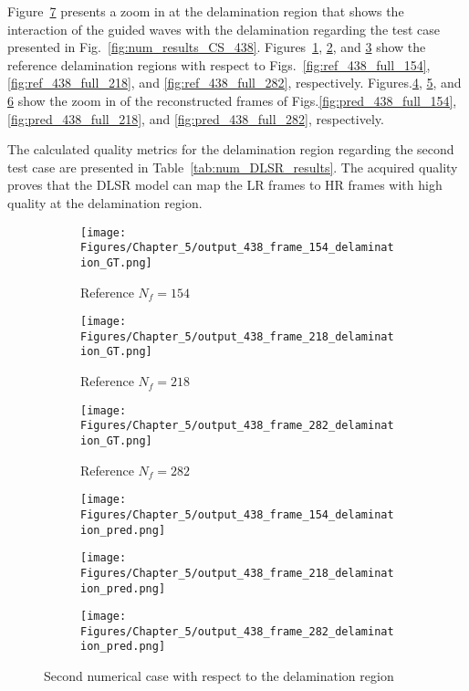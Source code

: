 Figure~\ref{fig:num_results_CS_damage_area_438} presents a zoom in at the delamination region that shows the interaction of the guided waves with the delamination regarding the test case presented in Fig.~\ref{fig:num_results_CS_438}.
Figures~\ref{fig:ref_438_damage_154}, \ref{fig:ref_438_damage_218}, and \ref{fig:ref_438_damage_282} show the reference delamination regions with respect to Figs.~\ref{fig:ref_438_full_154}, \ref{fig:ref_438_full_218}, and \ref{fig:ref_438_full_282}, respectively.
Figures.\ref{fig:pred_438_damage_154}, \ref{fig:pred_438_damage_218}, and \ref{fig:pred_438_damage_282} show the zoom in of the reconstructed frames of Figs.\ref{fig:pred_438_full_154}, \ref{fig:pred_438_full_218}, and \ref{fig:pred_438_full_282}, respectively.

The calculated quality metrics for the delamination region regarding the second test case are presented in Table~\ref{tab:num_DLSR_results}.
The acquired quality proves that the DLSR model can map the LR frames to HR frames with high quality at the delamination region.
\begin{figure} [!ht]
	\centering
	\begin{subfigure}[b]{.32\textwidth}
		\centering
		\texttt{[image: Figures/Chapter\_5/output\_438\_frame\_154\_delamination\_GT.png]}
		\caption{Reference $N_f=154$}
		\label{fig:ref_438_damage_154}
	\end{subfigure}
	\begin{subfigure}[b]{.32\textwidth}
		\centering
		\texttt{[image: Figures/Chapter\_5/output\_438\_frame\_218\_delamination\_GT.png]}
		\caption{Reference $N_f=218$}
		\label{fig:ref_438_damage_218}
	\end{subfigure}
	\begin{subfigure}[b]{.32\textwidth}
		\centering
		\texttt{[image: Figures/Chapter\_5/output\_438\_frame\_282\_delamination\_GT.png]}
		\caption{Reference $N_f=282$}
		\label{fig:ref_438_damage_282}	
	\end{subfigure}
	\begin{subfigure}[b]{.32\textwidth}
		\centering
		\texttt{[image: Figures/Chapter\_5/output\_438\_frame\_154\_delamination\_pred.png]}
		\caption{}
		\label{fig:pred_438_damage_154}
	\end{subfigure}
	\begin{subfigure}[b]{.32\textwidth}
		\centering
		\texttt{[image: Figures/Chapter\_5/output\_438\_frame\_218\_delamination\_pred.png]}
		\caption{}
		\label{fig:pred_438_damage_218}
	\end{subfigure}
	\begin{subfigure}[b]{.32\textwidth}
		\centering
		\texttt{[image: Figures/Chapter\_5/output\_438\_frame\_282\_delamination\_pred.png]}
		\caption{}
		\label{fig:pred_438_damage_282}	
	\end{subfigure}
	\caption{Second numerical case with respect to the delamination region}
	\label{fig:num_results_CS_damage_area_438}
\end{figure}


